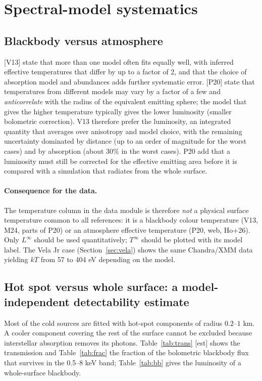 \documentclass[11pt,a4paper]{article}
\newcommand{\src}[1]{\textsf{[#1]}}
\begin{document}
\section{Spectral-model systematics}\label{sec:spectral}
\subsection{Blackbody versus atmosphere}
\src{V13} state that more than one model often fits equally well, with inferred effective temperatures that differ by up to a factor of 2, and that the choice of absorption model and abundances adds further systematic error. \src{P20} state that temperatures from different models may vary by a factor of a few and \emph{anticorrelate} with the radius of the equivalent emitting sphere; the model that gives the higher temperature typically gives the lower luminosity (smaller bolometric correction). V13 therefore prefer the luminosity, an integrated quantity that averages over anisotropy and model choice, with the remaining uncertainty dominated by distance (up to an order of magnitude for the worst cases) and by absorption (about 30\% in the worst cases). P20 add that a luminosity must still be corrected for the effective emitting area before it is compared with a simulation that radiates from the whole surface.

\paragraph{Consequence for the data.} The temperature column in the data module is therefore \emph{not} a physical surface temperature common to all references: it is a blackbody colour temperature (V13, M24, parts of P20) or an atmosphere effective temperature (P20, web, Ho+26). Only $L^\infty$ should be used quantitatively; $T^\infty$ should be plotted with its model label. The Vela Jr case (Section~\ref{sec:vela}) shows the same Chandra/XMM data yielding $kT$ from 57 to 404 eV depending on the model.

\subsection{Hot spot versus whole surface: a model-independent detectability estimate}
Most of the cold sources are fitted with hot-spot components of radius $0.2$--$1$ km. A cooler component covering the rest of the surface cannot be excluded because interstellar absorption removes its photons. Table~\ref{tab:trans} \src{est} shows the transmission and Table~\ref{tab:frac} the fraction of the bolometric blackbody flux that survives in the 0.5--8 keV band; Table~\ref{tab:bb} gives the luminosity of a whole-surface blackbody.
\end{document}
